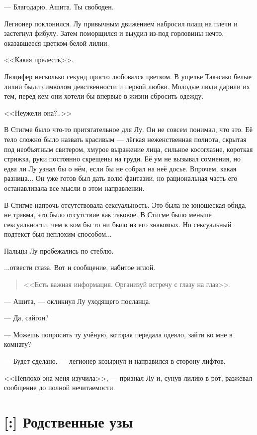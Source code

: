 --- Благодарю, Ашита.
Ты свободен.

Легионер поклонился.
Лу привычным движением набросил плащ на плечи и застегнул фибулу.
Затем поморщился и выудил из-под горловины нечто, оказавшееся цветком белой лилии.

<<Какая прелесть>>.

Люцифер несколько секунд просто любовался цветком.
В ущелье Такэсако белые лилии были символом девственности и первой любви.
Молодые люди дарили их тем, перед кем они хотели бы впервые в жизни сбросить одежду.

<<Неужели она?..>>

В Стигме было что-то притягательное для Лу.
Он не совсем понимал, что это.
Её тело сложно было назвать красивым --- лёгкая неженственная полнота, скрытая под необъятным свитером, хмурое выражение лица, сильное косоглазие, короткая стрижка, руки постоянно скрещены на груди.
Её ум не вызывал сомнения, но едва ли Лу узнал бы о нём, если бы не собрал на неё досье.
Впрочем, какая разница...
Он уже готов был дать волю фантазии, но рациональная часть его останавливала все мысли в этом направлении.

В Стигме напрочь отсутствовала сексуальность.
Это была не юношеская обида, не травма, это было отсутствие как таковое.
В Стигме было меньше сексуальности, чем в ком бы то ни было из его знакомых.
Но сексуальный подтекст был неплохим способом...

Пальцы Лу пробежались по стеблю.

...отвести глаза.
Вот и сообщение, набитое иглой.

\begin{quote}
<<Есть важная информация.
Организуй встречу с глазу на глаз>>.
\end{quote}

--- Ашита, --- окликнул Лу уходящего посланца.

--- Да, сайгон?

--- Можешь попросить ту учёную, которая передала одеяло, зайти ко мне в комнату?

--- Будет сделано, --- легионер козырнул и направился в сторону лифтов.

<<Неплохо она меня изучила>>, --- признал Лу и, сунув лилию в рот, разжевал сообщение до полной нечитаемости.

\section{[:] Родственные узы}

